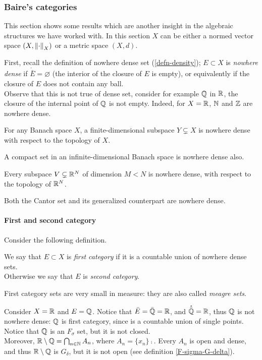 \subsubsection{Baire's categories} This section shows some results which are another insight in the algebraic structures we have worked with. In this section $X$ can be either a normed vector space $(X, \left\lVert\cdot\right\rVert_X)$ or a metric space $(X,d)$.

First, recall the definition of nowhere dense set (\vref{defn-density}); $E\subset X$ is \textit{nowhere dense} if $\mathring{\bar{E}} = \varnothing$ (the interior of the closure of $E$ is empty), or equivalently if the closure of $E$ does not contain any ball.\\
Observe that this is not true of dense set, consider for example $\mathbb Q$ in $\mathbb R$, the closure of the internal point of $\mathbb Q$ is not empty.
Indeed, for $X=\mathbb R$, $\mathbb N$ and $\mathbb Z$ are nowhere dense.

For any Banach space $X$, a finite-dimensional subspace $Y \subsetneq X$ is nowhere dense with respect to the topology of $X$.

A compact set in an infinite-dimensional Banach space is nowhere dense also.

Every subspace $V \subsetneq \mathbb R^N$ of dimension $M<N$ is nowhere dense, with respect to the topology of $\mathbb R^N$.

Both the Cantor set and its generalized counterpart are nowhere dense.

\paragraph{First and second category} Consider the following definition.
\begin{defn}
	We say that $E\subset X$ is \emph{first category} if it is a countable union of nowhere dense sets.\\
	Otherwise we say that $E$ is \emph{second category}.
\end{defn}
First category sets are very small in measure: they are also called \emph{meagre sets}.

\begin{exam}
	Consider $X = \mathbb R$ and $E=\mathbb Q$. Notice that $\bar{E}=\bar{\mathbb Q}=\mathbb R$, and $\mathring{\bar{\mathbb Q}}=\mathbb R$, thus $\mathbb Q$ is not nowhere dense: $\mathbb Q$ is first category, since is a countable union of single points.\\
	Notice that $\mathbb Q$ is an $F_\sigma$ set, but it is not closed. \\
	Moreover, $\mathbb R \setminus \mathbb Q = \bigcap_{n\in \mathbb N} A_n$, where $A_n=\{x_n\}\comp$. Every $A_n$ is open and dense, and thus $\mathbb R\setminus \mathbb Q$ is $G_\delta$, but it is not open (see definition \vref{F-sigma-G-delta}).
\end{exam}

